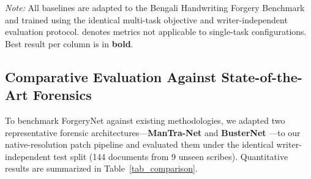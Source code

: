 \documentclass[pdflatex,sn-mathphys-num,iicol]{sn-jnl}
\begin{document}
\begin{table}[t]
\caption{Comparative evaluation of state-of-the-art forensic architectures and the proposed ForgeryNet on the Bengali Handwriting Forgery Benchmark under the identical writer-independent protocol (144 test documents, 9 completely unseen writers). CM, Spl, and CA denote category-specific stroke localization Dice for Copy-Move, Splicing, and Character Addition respectively.}\label{tab_comparison}
\centering
\setlength{\tabcolsep}{4.5pt}
\vskip3pt
\footnotesize\textit{Note:} All baselines are adapted to the Bengali Handwriting Forgery Benchmark and trained using the identical multi-task objective and writer-independent evaluation protocol. \textemdash{} denotes metrics not applicable to single-task configurations. Best result per column is in \textbf{bold}.
\end{table}

\subsection{Comparative Evaluation Against State-of-the-Art Forensics}\label{subsec5_3}
To benchmark ForgeryNet against existing methodologies, we adapted two representative forensic architectures—\textbf{ManTra-Net} \cite{bib9} and \textbf{BusterNet} \cite{bib10}—to our native-resolution patch pipeline and evaluated them under the identical writer-independent test split (144 documents from 9 unseen scribes). Quantitative results are summarized in Table~\ref{tab_comparison}.
\end{document}
